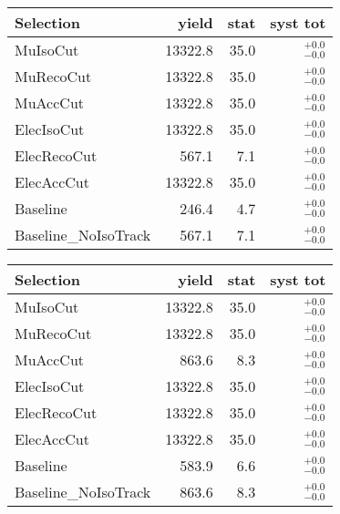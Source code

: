 
\begin{tabular}{l|rrr}
\toprule
              Selection & yield & stat & syst tot   \\ 
\midrule
               MuIsoCut & 13322.8 & 35.0 & ${}^{+0.0}_{-0.0}$ \\
              MuRecoCut & 13322.8 & 35.0 & ${}^{+0.0}_{-0.0}$ \\
               MuAccCut & 13322.8 & 35.0 & ${}^{+0.0}_{-0.0}$ \\
             ElecIsoCut & 13322.8 & 35.0 & ${}^{+0.0}_{-0.0}$ \\
            ElecRecoCut & 567.1 & 7.1 & ${}^{+0.0}_{-0.0}$ \\
             ElecAccCut & 13322.8 & 35.0 & ${}^{+0.0}_{-0.0}$ \\
               Baseline & 246.4 & 4.7 & ${}^{+0.0}_{-0.0}$ \\
   Baseline\_NoIsoTrack & 567.1 & 7.1 & ${}^{+0.0}_{-0.0}$ \\
\bottomrule
\end{tabular}



\begin{tabular}{l|rrr}
\toprule
              Selection & yield & stat & syst tot   \\ 
\midrule
               MuIsoCut & 13322.8 & 35.0 & ${}^{+0.0}_{-0.0}$ \\
              MuRecoCut & 13322.8 & 35.0 & ${}^{+0.0}_{-0.0}$ \\
               MuAccCut & 863.6 & 8.3 & ${}^{+0.0}_{-0.0}$ \\
             ElecIsoCut & 13322.8 & 35.0 & ${}^{+0.0}_{-0.0}$ \\
            ElecRecoCut & 13322.8 & 35.0 & ${}^{+0.0}_{-0.0}$ \\
             ElecAccCut & 13322.8 & 35.0 & ${}^{+0.0}_{-0.0}$ \\
               Baseline & 583.9 & 6.6 & ${}^{+0.0}_{-0.0}$ \\
   Baseline\_NoIsoTrack & 863.6 & 8.3 & ${}^{+0.0}_{-0.0}$ \\
\bottomrule
\end{tabular}


